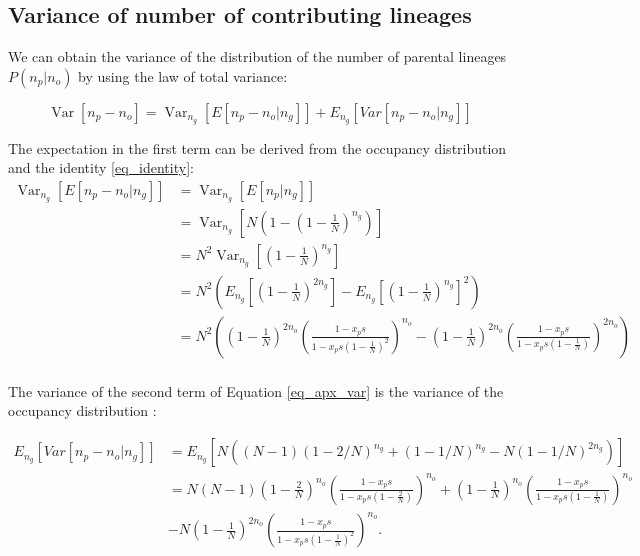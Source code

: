 \documentclass[review]{elsarticle}
\newcommand{\Var}{\operatorname{Var}}
\begin{document}
\subsection{Variance of number of contributing lineages}
\label{subsec_apx_variance}

We can obtain the variance of the distribution of the number of parental lineages $P(n_p | n_o)$ by using the law of total variance:

\begin{equation}
  \label{eq_apx_var}
\Var\left[n_p-n_o \right] = \Var_{n_g}\left[E\left[n_p-n_o | n_g \right]\right]+  E_{n_g}\left[Var\left[n_p-n_o | n_g \right]\right] 
\end{equation}

The expectation in the first term can be derived from the occupancy distribution and the identity
\ref{eq_identity}:
\begin{equation}
\begin{split}
\Var_{n_g}\left[E\left[n_p-n_o | n_g \right]\right] &= \Var_{n_g}\left[E\left[n_p| n_g \right]\right] \\
&= \Var_{n_g}\left[N\left(1-(1-\frac{1}{N})^{n_g} \right) \right] \\ 
&= N^2 \Var_{n_g}\left[(1-\frac{1}{N})^{n_g} \right] \\
&= N^2 \left( E_{n_g}\left[(1-\frac{1}{N})^{2n_g} \right] - E_{n_g}\left[(1-\frac{1}{N})^{n_g} \right]^2\right) \\
&= N^2 \left( \left(1-\frac{1}{N}\right)^{2n_o} \left(\frac{1-x_ps}{1-x_ps  \left(1-\frac{1}{N}\right)^2}\right)^{n_o} 
-   \left(1-\frac{1}{N}\right)^{2n_o} \left(\frac{1-x_ps}{1-x_ps  \left(1-\frac{1}{N}\right)}\right)^{2n_o} \right) \\
\end{split}
\end{equation}

The variance of the second term of Equation \eqref{eq_apx_var} is the variance of the occupancy distribution \cite{ref}:

\begin{equation}
\begin{split}
E_{n_g}\left[Var\left[n_p-n_o | n_g \right]\right] & = E_{n_g}\left[N ((N - 1) (1 - 2/N)^{n_g} + (1 - 1/N)^{n_g} - N (1 - 1/N)^{2 n_g}) \right] \\
& = N (N-1)  \left(1-\frac{2}{N}\right)^{n_o} \left(\frac{1-x_p s}{1-x_p s  \left(1-\frac{2}{N}\right)}\right)^{n_o} +  \left(1-\frac{1}{N}\right)^{n_o} \left(\frac{1-x_p s}{1-x_p s  \left(1-\frac{1}{N}\right)}\right)^{n_o} \\
&-N  \left(1-\frac{1}{N}\right)^{2n_o} \left(\frac{1- x_p s}{1-x_p s  \left(1-\frac{1}{N}\right)^2}\right)^{n_o}. 
\end{split}
\end{equation}
\end{document}
